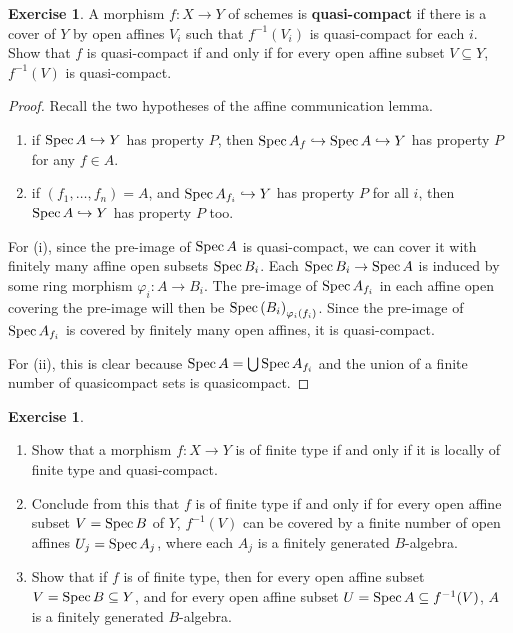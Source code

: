 \documentclass[]{pcmi}
\theoremstyle{plain}
\theoremstyle{definition}
\newtheorem{Exercise}[subsubsection]{Exercise}
\theoremstyle{remark}
\begin{document}
\begin{Exercise}\label{Exercise:2.3.2}
    A morphism $f : X \to Y$ of schemes is \textbf{quasi-compact} if there is a cover of $Y$ by open affines $V_i$ such that $f^{-1}(V_i)$ is quasi-compact for each $i$. Show that $f$ is quasi-compact if and only if for every open affine subset $V \subseteq Y$, $f^{-1}(V)$ is quasi-compact. 
\end{Exercise}

\begin{proof}
    Recall the two hypotheses of the affine communication lemma. 
    \begin{enumerate}[label = (\roman*)]
        \item if $\operatorname{Spec} A \hookrightarrow Y$ has property $P$, then $\operatorname{Spec} A_f \hookrightarrow \operatorname{Spec} A \hookrightarrow Y$ has property $P$ for any $f \in A$. 
        \item if $(f_1, \ldots, f_n) = A$, and $\operatorname{Spec} A_{f_i} \hookrightarrow Y$ has property $P$ for all $i$, then $\operatorname{Spec} A \hookrightarrow Y$ has property $P$ too. 
    \end{enumerate}
    For (i), since the pre-image of $\operatorname{Spec} A$ is quasi-compact, we can cover it with finitely many affine open subsets $\operatorname{Spec} B_i$. Each $\operatorname{Spec} B_i \to \operatorname{Spec} A$ is induced by some ring morphism $\varphi_i : A \to B_i$. The pre-image of $\operatorname{Spec} A_{f_i}$ in each affine open covering the pre-image will then be $\operatorname{Spec} \left( B_i \right)_{\varphi_i(f_i)}$. Since the pre-image of $\operatorname{Spec} A_{f_i}$ is covered by finitely many open affines, it is quasi-compact. 

    For (ii), this is clear because $\operatorname{Spec} A = \bigcup \operatorname{Spec} A_{f_i}$ and the union of a finite number of quasicompact sets is quasicompact. 
\end{proof}

\begin{Exercise}
    \phantom{h}
    \begin{enumerate}[label = (\alph*)]
        \item Show that a morphism $f : X \to Y$ is of finite type if and only if it is locally of finite type and quasi-compact. 
        \item Conclude from this that $f$ is of finite type if and only if for every open affine subset $V = \operatorname{Spec} B$ of $Y$, $f^{-1}(V)$ can be covered by a finite number of open affines $U_j  = \operatorname{Spec} A_j$, where each $A_j$ is a finitely generated $B$-algebra.
        \item Show that if $f$ is of finite type, then for every open affine subset $V = \operatorname{Spec} B \subseteq Y$, and for every open affine subset $U = \operatorname{Spec} A \subseteq f^{-1}(V)$, $A$ is a finitely generated $B$-algebra. 
    \end{enumerate}
\end{Exercise}
\end{document}

